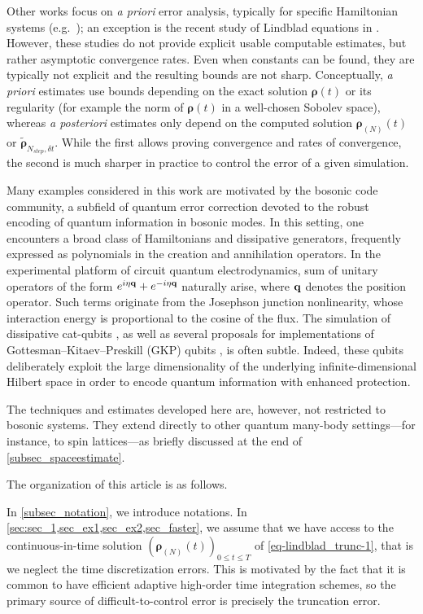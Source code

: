 \documentclass[a4paper,onecolumn,amsmath,amssymb,amsfonts,accepted=2026-03-06]{quantumarticle}
\newcommand{\qop}{{\bf q}}
\newcommand{\rN}{{\boldsymbol{\rho}_{(N)}}}
\begin{document}
Other works focus on \textit{a priori} error analysis, typically for specific Hamiltonian systems (e.g.\ \cite{Tong2022provablyaccurate,Peng_2025}); an exception is the recent study of Lindblad equations in \cite{robin2025convergenceanalysisgalerkinapproximations}. However, these studies do not provide explicit usable computable estimates, but rather asymptotic convergence rates. Even when constants can be found, they are typically not explicit and the resulting bounds are not sharp. Conceptually, \textit{a priori} estimates use bounds depending on the exact solution $\boldsymbol{\rho}(t)$ or its regularity (for example the norm of $ \boldsymbol{\rho}(t)$ in a well-chosen Sobolev space), whereas \textit{a posteriori} estimates only depend on the computed solution $\rN(t)$ or $\tilde{ \boldsymbol{\rho}}_{N_{step},\delta t}$. While the  first allows proving convergence and rates of convergence, the second is much sharper in practice to control the error of a given simulation.

Many examples considered in this work are motivated by the bosonic code community, a subfield of quantum error correction devoted to the robust encoding of quantum information in bosonic modes. In this setting, one encounters a broad class of Hamiltonians and dissipative generators, frequently expressed as polynomials in the creation and annihilation operators. In the experimental platform of circuit quantum electrodynamics, sum of unitary operators of the form $e^{i\eta \qop}+e^{-i\eta \qop}$ naturally arise, where $\qop$ denotes the position operator. Such terms originate from the Josephson junction nonlinearity, whose interaction energy is proportional to the cosine of the flux. The simulation of dissipative cat-qubits \cite{mirrahimiDynamicallyProtectedCatqubits2014}, as well as several proposals for implementations of Gottesman--Kitaev--Preskill (GKP) qubits \cite{GKP_original}, is often subtle. Indeed, these qubits deliberately exploit the large dimensionality of the underlying infinite-dimensional Hilbert space in order to encode quantum information with enhanced protection.

The techniques and estimates developed here are, however, not restricted to bosonic systems. They extend directly to other quantum many-body settings—for instance, to spin lattices—as briefly discussed at the end of \cref{subsec_spaceestimate}.


The organization of this article is as follows.

In \cref{subsec_notation}, we introduce notations. In \cref{sec:sec_1,sec_ex1,sec_ex2,sec_faster}, we assume that we have access to the continuous-in-time solution $(\rN(t))_{0 \leq t \leq T}$ of \cref{eq-lindblad_trunc-1}, that is we neglect the time discretization errors. This is motivated by the fact that it is common to have efficient adaptive high-order time integration schemes, so the primary source of difficult-to-control error is precisely the truncation error.
\end{document}

